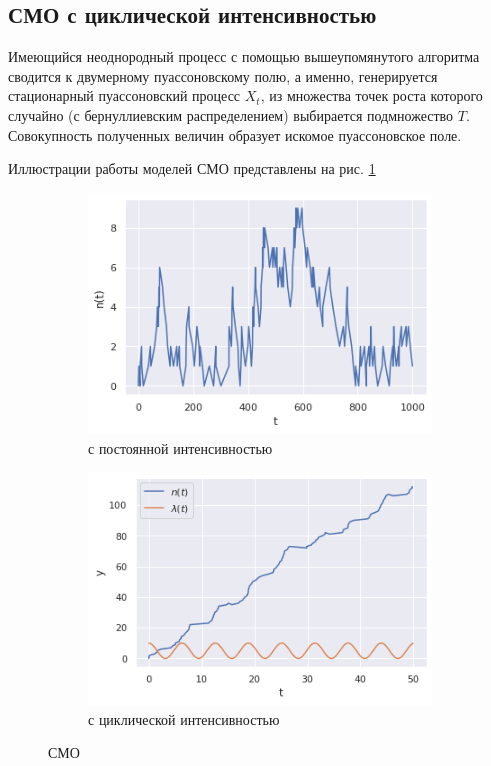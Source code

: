 \subsection{СМО с циклической интенсивностью}
    Имеющийся неоднородный процесс с помощью вышеупомянутого алгоритма сводится 
    к двумерному пуассоновскому полю, а именно, генерируется стационарный 
    пуассоновский процесс $X_t$, из множества точек роста которого случайно 
    (с бернуллиевским распределением) выбирается подмножество $T$. Совокупность 
    полученных величин образует искомое пуассоновское поле.

    Иллюстрации работы моделей СМО представлены на рис. \ref{smo} 

    \begin{figure}[tbp]
        \centering
        \begin{subfigure}[b]{0.48\textwidth}
            \centering
            \includegraphics[width=\textwidth]{resources/task11_smo_const.png}
            \caption{с постоянной интенсивностью}
        \end{subfigure}
        \hfill
        \begin{subfigure}[b]{0.48\textwidth}
            \centering
            \includegraphics[width=\textwidth]{resources/task11_smo_cyclic.png}
            \caption{с циклической интенсивностью}
        \end{subfigure}
        \caption{СМО}
        \label{smo}
    \end{figure}

